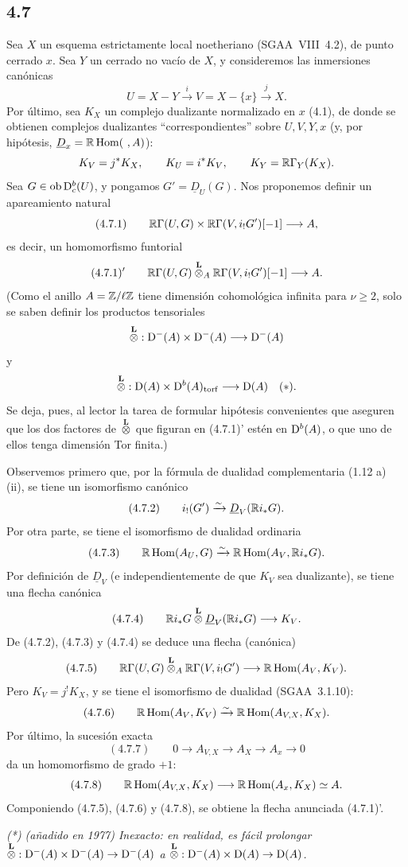 \subsection*{4.7}
Sea $X$ un esquema estrictamente local noetheriano (SGAA~VIII~4.2), de punto cerrado $x$. Sea $Y$ un cerrado no vacío de $X$, y consideremos las inmersiones canónicas
\[
U=X-Y\xrightarrow{i}V=X-\{x\}\xrightarrow{j}X.
\]
Por último, sea $K_X$ un complejo dualizante normalizado en $x$ (4.1), de donde se obtienen complejos dualizantes \textquotedblleft correspondientes\textquotedblright{} sobre $U,V,Y,x$ (y, por hipótesis, $\underline{D}_x=\R\Hom(\ ,A)$):
\[
K_V=j^*K_X,
\qquad K_U=i^*K_V,
\qquad K_Y=\mathbb{R}\Gamma_Y(K_X).
\]
Sea $G\in\operatorname{ob}\mathrm{D}_c^b(U)$, y pongamos $G'=\underline{D}_U(G)$. Nos proponemos definir un apareamiento natural
\[
(4.7.1)\qquad \mathbb{R}\Gamma(U,G)\times \mathbb{R}\Gamma(V,i_!G')[-1]\longrightarrow A,
\]
es decir, un homomorfismo funtorial
\[
(4.7.1)'\qquad \mathbb{R}\Gamma(U,G)\overset{\mathbf L}{\otimes}_A\mathbb{R}\Gamma(V,i_!G')[-1]\longrightarrow A.
\]
(Como el anillo $A=\mathbb{Z}/\ell\mathbb{Z}$ tiene dimensión cohomológica infinita para $\nu\geqslant2$, solo se saben definir los productos tensoriales
\[
\overset{\mathbf L}{\otimes}:\mathrm{D}^-(A)\times\mathrm{D}^-(A)\longrightarrow\mathrm{D}^-(A)
\]
y
\[
\overset{\mathbf L}{\otimes}:\mathrm{D}(A)\times\mathrm{D}^b(A)_{\mathrm{torf}}\longrightarrow\mathrm{D}(A)\quad(*).
\]
Se deja, pues, al lector la tarea de formular hipótesis convenientes que aseguren que los dos factores de $\overset{\mathbf L}{\otimes}$ que figuran en (4.7.1)' estén en $\mathrm{D}^b(A)$, o que uno de ellos tenga dimensión Tor finita.)

Observemos primero que, por la fórmula de dualidad complementaria (1.12 a) (ii), se tiene un isomorfismo canónico
\[
(4.7.2)\qquad i_!(G')\xrightarrow{\sim}\underline{D}_V(\mathbb{R} i_*G).
\]
Por otra parte, se tiene el isomorfismo de dualidad ordinaria
\[
(4.7.3)\qquad \mathbb{R}\operatorname{Hom}(A_U,G)\xrightarrow{\sim}\mathbb{R}\operatorname{Hom}(A_V,\mathbb{R} i_*G).
\]
Por definición de $\underline{D}_V$ (e independientemente de que $K_V$ sea dualizante), se tiene una flecha canónica
\[
(4.7.4)\qquad \mathbb{R} i_*G\overset{\mathbf L}{\otimes}\underline{D}_V(\mathbb{R} i_*G)\longrightarrow K_V.
\]
De (4.7.2), (4.7.3) y (4.7.4) se deduce una flecha (canónica)
\[
(4.7.5)\qquad \mathbb{R}\Gamma(U,G)\overset{\mathbf L}{\otimes}_A\mathbb{R}\Gamma(V,i_!G')\longrightarrow \mathbb{R}\operatorname{Hom}(A_V,K_V).
\]
Pero $K_V=j^{!}K_X$, y se tiene el isomorfismo de dualidad (SGAA~3.1.10):
\[
(4.7.6)\qquad \mathbb{R}\operatorname{Hom}(A_V,K_V)\xrightarrow{\sim}\mathbb{R}\operatorname{Hom}(A_{V,X},K_X).
\]
Por último, la sucesión exacta
\[
(4.7.7)\qquad 0\longrightarrow A_{V,X}\longrightarrow A_X\longrightarrow A_x\longrightarrow 0
\]
da un homomorfismo de grado $+1$:
\[
(4.7.8)\qquad \mathbb{R}\operatorname{Hom}(A_{V,X},K_X)\longrightarrow \mathbb{R}\operatorname{Hom}(A_x,K_X)\simeq A.
\]
Componiendo (4.7.5), (4.7.6) y (4.7.8), se obtiene la flecha anunciada (4.7.1)'.

\emph{(*) (añadido en 1977) Inexacto: en realidad, es fácil prolongar $\overset{\mathbf L}{\otimes}:\mathrm{D}^-(A)\times\mathrm{D}^-(A)\to\mathrm{D}^-(A)$ a $\overset{\mathbf L}{\otimes}:\mathrm{D}^-(A)\times\mathrm{D}(A)\to\mathrm{D}(A)$.}
